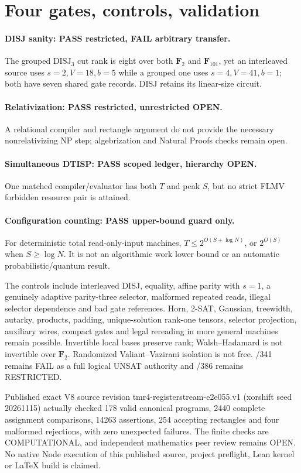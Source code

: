 \documentclass[11pt]{article}
\begin{document}
\section{Four gates, controls, validation}
\paragraph{DISJ sanity: PASS restricted, FAIL arbitrary transfer.} The grouped $\mathrm{DISJ}_3$ cut rank is eight over both $\mathbf F_2$ and $\mathbf F_{101}$, yet an interleaved source uses $s=2,V=18,b=5$ while a grouped one uses $s=4,V=41,b=1$; both have seven shared gate records. DISJ retains its linear-size circuit.
\paragraph{Relativization: PASS restricted, unrestricted OPEN.} A relational compiler and rectangle argument do not provide the necessary nonrelativizing NP step; algebrization and Natural Proofs checks remain open.
\paragraph{Simultaneous DTISP: PASS scoped ledger, hierarchy OPEN.} One matched compiler/evaluator has both $T$ and peak $S$, but no strict FLMV forbidden resource pair is attained.
\paragraph{Configuration counting: PASS upper-bound guard only.} For deterministic total read-only-input machines, $T\leq2^{O(S+\log N)}$, or $2^{O(S)}$ when $S\geq\log N$. It is not an algorithmic work lower bound or an automatic probabilistic/quantum result.

The controls include interleaved DISJ, equality, affine parity with $s=1$, a genuinely adaptive parity-three selector, malformed repeated reads, illegal selector dependence and bad gate references. Horn, 2-SAT, Gaussian, treewidth, autarky, products, padding, unique-solution rank-one tensors, selector projection, auxiliary wires, compact gates and legal rereading in more general machines remain possible. Invertible local bases preserve rank; Walsh--Hadamard is not invertible over $\mathbf F_2$. Randomized Valiant--Vazirani isolation is not free. /341 remains FAIL as a full logical UNSAT authority and /386 remains RESTRICTED.

Published exact V8 source revision tmr4-registerstream-e2e055.v1 (xorshift seed 20261115) actually checked 178 valid canonical programs, 2440 complete assignment comparisons, 14263 assertions, 254 accepting rectangles and four malformed rejections, with zero unexpected failures. The finite checks are COMPUTATIONAL, and independent mathematics peer review remains OPEN. No native Node execution of this published source, project preflight, Lean kernel or LaTeX build is claimed.
\end{document}
